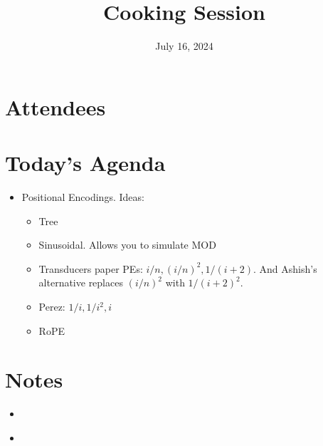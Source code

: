 \documentclass{article}
\title{Cooking Session}
\date{July 16, 2024}
\begin{document}
\maketitle

\section{Attendees}


\section{Today's Agenda}
\begin{itemize}
    \item Positional Encodings. Ideas:
        \begin{itemize}
            \item Tree
            \item Sinusoidal. Allows you to simulate MOD
            \item Transducers paper PEs: $i/n,(i/n)^2, 1/(i+2)$. And Ashish's alternative replaces $(i/n)^2$ with $1/(i+2)^2$.
            \item Perez:  $1/i, 1/i^2, i$
            \item RoPE
        \end{itemize}
\end{itemize}

\section{Notes}
\begin{itemize}
    \item
\end{itemize}

\begin{itemize}
    \item
\end{itemize}



\end{document}
